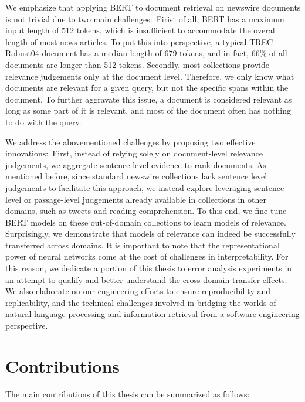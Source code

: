 We emphasize that applying BERT to document retrieval on newswire documents is not trivial due to two main challenges:\
Firist of all, BERT has a maximum input length of 512 tokens, which is insufficient to accommodate the overall length of most news articles.
To put this into perspective, a typical TREC Robust04 document has a median length of 679 tokens, and in fact, 66\% of all documents are longer than 512 tokens.
Secondly, most collections provide relevance judgements only at the document level.
Therefore, we only know what documents are relevant for a given query, but not the specific spans within the document.
To further aggravate this issue, a document is considered relevant as long as some part of it is relevant, and most of the document often has nothing to do with the query.

We address the abovementioned challenges by proposing two effective innovations:\
First, instead of relying solely on document-level relevance judgements, we aggregate sentence-level evidence to rank documents.
As mentioned before, since standard newswire collections lack sentence level judgements to facilitate this approach, we instead explore leveraging sentence-level or passage-level judgements already available in collections in other domains, such as tweets and reading comprehension.
To this end, we fine-tune BERT models on these out-of-domain collections to learn models of relevance.
Surprisingly, we demonstrate that models of relevance can indeed be successfully transferred across domains.
It is important to note that the representational power of neural networks come at the cost of challenges in interpretability.
For this reason, we dedicate a portion of this thesis to error analysis experiments in an attempt to qualify and better understand the cross-domain transfer effects.
We also elaborate on our engineering efforts to ensure reproducibility and replicability, and the technical challenges involved in bridging the worlds of natural language processing and information retrieval from a software engineering perspective.

\vfill

\section{Contributions}

The main contributions of this thesis can be summarized as follows:\\

